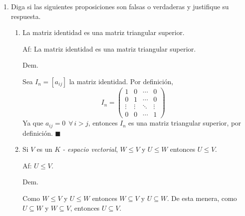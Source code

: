 \documentclass[fleqn]{article}                       %
\begin{document}
    \begin{enumerate}
        \item Diga si las siguientes proposiciones son falsas o verdaderas y justifique su respuesta.
    
        \begin{enumerate}
            \item La matriz identidad es una matriz triangular superior. \par
            
            Af: La matriz identidad es una matriz triangular superior. \par

            \hspace{2.7mm} Dem. \par

            Sea $ I_n = [a_{ij}] $ la matriz identidad. Por definición, 
            \begin{equation*}
                I_n = 
                \begin{pmatrix}
                    1      & 0      & \cdots & 0\\ 
                    0      & 1      & \cdots & 0\\
                    \vdots & \vdots & \ddots & \vdots\\
                    0      & 0      & \cdots & 1
                \end{pmatrix}
            \end{equation*}
            Ya que $ a_{ij} = 0 \;\, \forall \, i > j $, entonces $ I_n $ es una matriz triangular superior, por definición. $ \blacksquare $ \par

            \item Si $ V $ es un $ K $ \textsl{- espacio vectorial}, $ W \leq V $ y $ U \leq W $ entonces $ U \leq V $. \par
            
            Af: $ U \leq V $. \par

            \hspace{2.7mm} Dem. \par

            Como $ W \leq V $ y $ U \leq W $ entonces $ W \subseteq V $ y $ U \subseteq W $. De esta menera, como $ U \subseteq W $ y $ W \subseteq V $, entonces $ U \subseteq V $. \par


\end{enumerate}
\end{enumerate}
\end{document}
